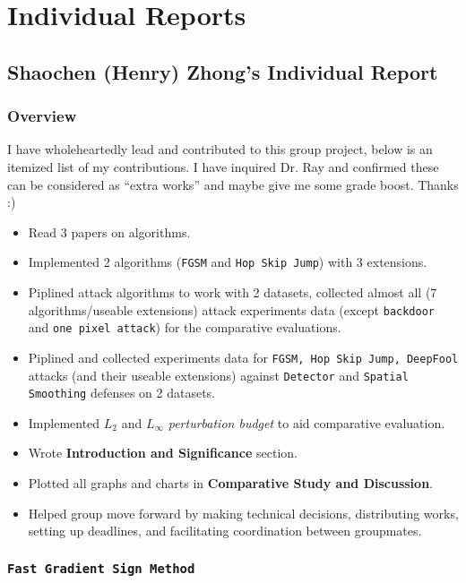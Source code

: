 \documentclass[11pt]{article}
\newcommand{\ilc}{\texttt}
\begin{document}
\section{Individual Reports}



\subsection{Shaochen (Henry) Zhong's Individual Report}
\subsubsection{Overview}

I have wholeheartedly lead and contributed to this group project, below is an itemized list of my contributions. I have inquired Dr. Ray and confirmed these can be considered as ``extra works'' and maybe give me some grade boost. Thanks :)
\begin{itemize}
    \item Read 3 papers on algorithms.
    \item Implemented 2 algorithms (\ilc{FGSM} and \ilc{Hop Skip Jump}) with 3 extensions.
    \item Piplined attack algorithms to work with 2 datasets, collected almost all (7 algorithms/useable extensions) attack experiments data (except \ilc{backdoor} and \ilc{one pixel attack}) for the comparative evaluations.
    \item Piplined and collected experiments data for \ilc{FGSM, Hop Skip Jump, DeepFool} attacks (and their useable extensions) against \ilc{Detector} and \ilc{Spatial Smoothing} defenses on 2 datasets.
    \item Implemented $L_2$ and $L_{\infty}$ \textit{perturbation budget} to aid comparative evaluation.
    \item Wrote \textbf{Introduction and Significance} section.
    \item Plotted all graphs and charts in \textbf{Comparative Study and Discussion}.
    \item Helped group move forward by making technical decisions, distributing works, setting up deadlines, and facilitating coordination between groupmates.
\end{itemize}

\subsubsection{\ilc{Fast Gradient Sign Method}}
\end{document}
